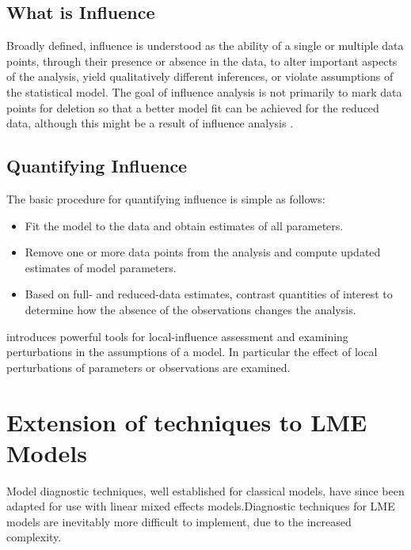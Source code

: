 \documentclass[12pt, a4paper]{article}
\begin{document}
	
	\subsection{What is Influence} %
	
	Broadly defined, influence is understood as the ability of a single or multiple data points, through their presence or absence in the data, to alter important aspects of the analysis, yield qualitatively different inferences, or violate assumptions of the statistical model. The goal of influence analysis is not primarily to mark data
	points for deletion so that a better model fit can be achieved for the reduced data, although this might be a result of influence analysis \citep{schabenberger}.
	
	\subsection{Quantifying Influence}  %
	
	The basic procedure for quantifying influence is simple as follows:
	
	\begin{itemize}
		\item Fit the model to the data and obtain estimates of all parameters.
		\item Remove one or more data points from the analysis and compute updated estimates of model parameters.
		\item Based on full- and reduced-data estimates, contrast quantities of interest to determine how the absence of the observations changes the analysis.
	\end{itemize}
	
	\citet{cook86} introduces powerful tools for local-influence assessment and examining perturbations in the assumptions of a model. In particular the effect of local perturbations of parameters or observations are examined.
	
	
	\newpage
	\section{Extension of techniques to LME Models} %
	
	Model diagnostic techniques, well established for classical models, have since been adapted for use with linear mixed effects models.Diagnostic techniques for LME models are inevitably more difficult to implement, due to the increased complexity.
	
\end{document}
